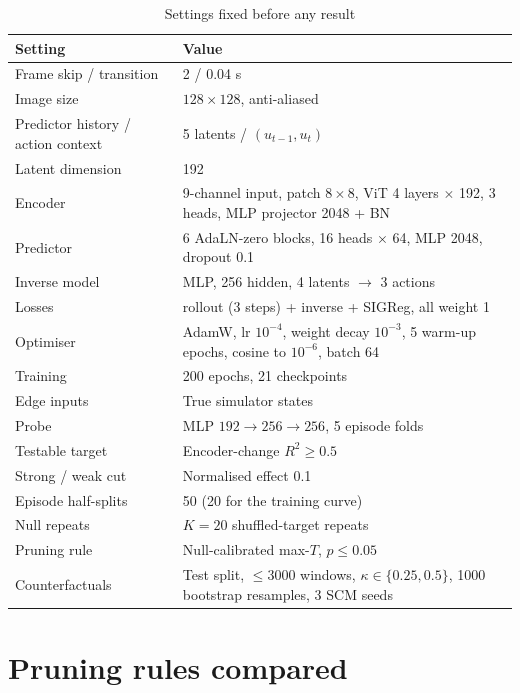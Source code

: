 \documentclass[11pt, a4paper, oneside,enumerate,textcomp]{report}
\newcommand{\Rsq}{R^2}
\begin{document}
\begin{table}[htbp]
\caption{Settings fixed before any result}
\centering
\small
\begin{tabular}{| p{6.0cm} | p{7.6cm} |}
\hline
\textbf{Setting} & \textbf{Value} \\
\hline
Frame skip / transition & 2 / 0.04 s \\
\hline
Image size & $128 \times 128$, anti-aliased \\
\hline
Predictor history / action context & 5 latents / $(u_{t-1}, u_t)$ \\
\hline
Latent dimension & 192 \\
\hline
Encoder & 9-channel input, patch $8\times8$, ViT 4 layers $\times$ 192, 3 heads, MLP projector 2048 + BN \\
\hline
Predictor & 6 AdaLN-zero blocks, 16 heads $\times$ 64, MLP 2048, dropout 0.1 \\
\hline
Inverse model & MLP, 256 hidden, 4 latents $\to$ 3 actions \\
\hline
Losses & rollout (3 steps) + inverse + SIGReg, all weight 1 \\
\hline
Optimiser & AdamW, lr $10^{-4}$, weight decay $10^{-3}$, 5 warm-up epochs, cosine to $10^{-6}$, batch 64 \\
\hline
Training & 200 epochs, 21 checkpoints \\
\hline
Edge inputs & True simulator states \\
\hline
Probe & MLP $192 \rightarrow 256 \rightarrow 256$, 5 episode folds \\
\hline
Testable target & Encoder-change $\Rsq \geq 0.5$ \\
\hline
Strong / weak cut & Normalised effect 0.1 \\
\hline
Episode half-splits & 50 (20 for the training curve) \\
\hline
Null repeats & $K = 20$ shuffled-target repeats \\
\hline
Pruning rule & Null-calibrated max-$T$, $p \leq 0.05$ \\
\hline
Counterfactuals & Test split, $\leq 3000$ windows, $\kappa \in \{0.25, 0.5\}$, 1000 bootstrap resamples, 3 SCM seeds \\
\hline
\end{tabular}
\label{tab:settings}
\end{table}

\section{Pruning rules compared}
\end{document}
